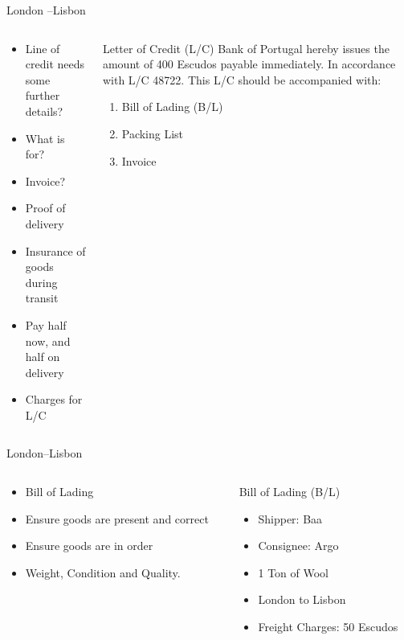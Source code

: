 \documentclass[pdf,table]{beamer}
\begin{document}
\begin{frame}{London \---Lisbon}
	\begin{columns}[T]
		\begin{column}{0.48\textwidth}
			\begin{itemize}
				\item Line of credit needs some further details?
				\item What is for?
				\item Invoice?
				\item Proof of delivery
				\item Insurance of goods during transit
				\item Pay half now, and half on delivery
				\item Charges for L/C
			\end{itemize}
		\end{column}
		\begin{column}{0.48\textwidth}
			\begin{block}{Letter of Credit (L/C)}
				Bank of Portugal hereby issues the amount of 400  Escudos payable immediately. In accordance with L/C 48722. This L/C should be accompanied with:
				\begin{enumerate}
					\item Bill of Lading (B/L)
					\item Packing List
					\item Invoice
				\end{enumerate}
				
			\end{block}
		\end{column}
	\end{columns}	
\end{frame}

\begin{frame}{London\---Lisbon}
	\begin{columns}[T]
		\begin{column}{0.48\textwidth}
			\begin{itemize}
				\item Bill of Lading
				\item Ensure goods are present and correct
				\item Ensure goods are in order
				\item Weight, Condition and Quality.
			\end{itemize}
		\end{column}
		\begin{column}{0.48\textwidth}
			\begin{block}{Bill of Lading (B/L)}
				\begin{itemize}
					\item Shipper: Baa
					\item Consignee: Argo
					\item 1 Ton of Wool
					\item London to Lisbon 
					\item Freight Charges: 50 Escudos 
				\end{itemize}
			\end{block}
		\end{column}
	\end{columns}	
\end{frame}
\end{document}
